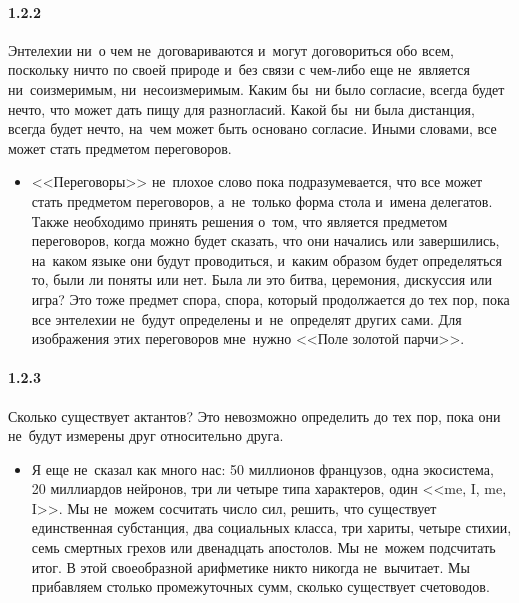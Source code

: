 
\paragraph{1.2.2}\hypertarget{par:1.2.2}{} Энтелехии ни~о чем не~договариваются и~могут договориться обо всем, поскольку ничто по своей природе и~без связи с чем-либо еще не~является ни~соизмеримым, ни~несоизмеримым. Каким бы~ни было согласие, всегда будет нечто, что может дать пищу для разногласий. Какой бы~ни была дистанция, всегда будет нечто, на~чем может быть основано согласие. Иными словами, все может стать предметом переговоров.
	\begin{itemize}
	\item <<Переговоры>> не~плохое слово пока подразумевается, что все может стать предметом переговоров, а~не~только форма стола и~имена делегатов. Также необходимо принять решения о~том, что является предметом переговоров, когда можно будет сказать, что они начались или завершились, на~каком языке они будут проводиться, и~каким образом будет определяться то, были ли поняты или нет. Была ли это битва, церемония, дискуссия или игра? Это тоже предмет спора, спора, который продолжается до тех пор, пока все энтелехии не~будут определены и~не~определят других сами. Для изображения этих переговоров мне~нужно <<Поле золотой парчи>>.
	\end{itemize}

\paragraph{1.2.3}\hypertarget{par:1.2.3}{} Сколько существует актантов? Это невозможно определить до тех пор, пока они не~будут измерены друг относительно друга.
	\begin{itemize}
	\item Я еще не~сказал как много нас: 50 миллионов французов, одна экосистема, 20 миллиардов нейронов, три ли четыре типа характеров, один <<me, I, me, I>>. Мы не~можем сосчитать число сил, решить, что существует единственная субстанция, два социальных класса, три хариты, четыре стихии, семь смертных грехов или двенадцать апостолов. Мы не~можем подсчитать итог. В этой своеобразной арифметике никто никогда не~вычитает. Мы прибавляем столько промежуточных сумм, сколько существует счетоводов.
	\end{itemize}

